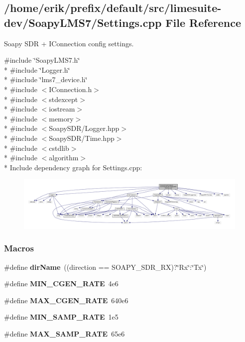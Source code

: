 \subsection{/home/erik/prefix/default/src/limesuite-\/dev/\+Soapy\+L\+M\+S7/\+Settings.cpp File Reference}
\label{Settings_8cpp}


Soapy S\+DR + I\+Connection config settings.  


{\ttfamily \#include \char`\"{}Soapy\+L\+M\+S7.\+h\char`\"{}}\\*
{\ttfamily \#include \char`\"{}Logger.\+h\char`\"{}}\\*
{\ttfamily \#include \char`\"{}lms7\+\_\+device.\+h\char`\"{}}\\*
{\ttfamily \#include $<$I\+Connection.\+h$>$}\\*
{\ttfamily \#include $<$stdexcept$>$}\\*
{\ttfamily \#include $<$iostream$>$}\\*
{\ttfamily \#include $<$memory$>$}\\*
{\ttfamily \#include $<$Soapy\+S\+D\+R/\+Logger.\+hpp$>$}\\*
{\ttfamily \#include $<$Soapy\+S\+D\+R/\+Time.\+hpp$>$}\\*
{\ttfamily \#include $<$cstdlib$>$}\\*
{\ttfamily \#include $<$algorithm$>$}\\*
Include dependency graph for Settings.\+cpp\+:
\nopagebreak
\begin{figure}[H]
\begin{center}
\leavevmode
\includegraphics[width=350pt]{dc/d21/Settings_8cpp__incl}
\end{center}
\end{figure}
\subsubsection*{Macros}
\begin{DoxyCompactItemize}
\item 
\#define {\bf dir\+Name}~((direction == S\+O\+A\+P\+Y\+\_\+\+S\+D\+R\+\_\+\+RX)?\char`\"{}Rx\char`\"{}\+:\char`\"{}Tx\char`\"{})
\item 
\#define {\bf M\+I\+N\+\_\+\+C\+G\+E\+N\+\_\+\+R\+A\+TE}~4e6
\item 
\#define {\bf M\+A\+X\+\_\+\+C\+G\+E\+N\+\_\+\+R\+A\+TE}~640e6
\item 
\#define {\bf M\+I\+N\+\_\+\+S\+A\+M\+P\+\_\+\+R\+A\+TE}~1e5
\item 
\#define {\bf M\+A\+X\+\_\+\+S\+A\+M\+P\+\_\+\+R\+A\+TE}~65e6
\end{DoxyCompactItemize}


